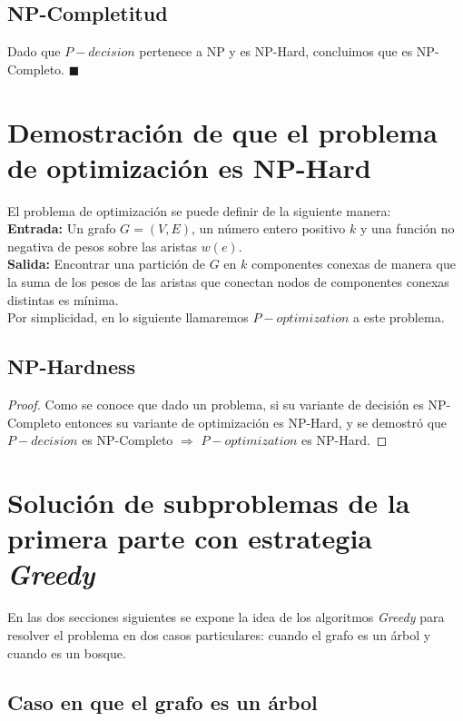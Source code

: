 \documentclass[a4paper, 12pt]{article}
\begin{document}
\subsection{NP-Completitud}

Dado que $P-decision$ pertenece a NP y es NP-Hard, concluimos que es NP-Completo. $\blacksquare$


\section{Demostración de que el problema de optimización es NP-Hard}

El problema de optimización se puede definir de la siguiente manera:\\

\textbf{Entrada:} Un grafo \( G = (V, E) \), un número entero positivo \( k \) y 
una función no negativa de pesos sobre las aristas $w(e)$.\\

\textbf{Salida:} Encontrar una partición de \( G \) en \( k \) componentes conexas de manera que 
la suma de los pesos de las aristas que conectan nodos de componentes conexas distintas es mínima.\\

Por simplicidad, en lo siguiente llamaremos $P-optimization$ a este problema. 

\subsection{NP-Hardness}

\begin{proof}
    Como se conoce que dado un problema, si su variante de decisión es NP-Completo entonces su variante de optimización es NP-Hard, y se demostró que $P-decision$ es NP-Completo $\Rightarrow$ $P-optimization$ es NP-Hard.
\end{proof}

\section{Solución de subproblemas de la primera parte con estrategia \textit{Greedy}}

En las dos secciones siguientes se expone la idea de los algoritmos \textit{Greedy} para resolver el problema en dos casos particulares: cuando el grafo es un árbol y cuando es un bosque.

\subsection{Caso en que el grafo es un árbol}
\end{document}
